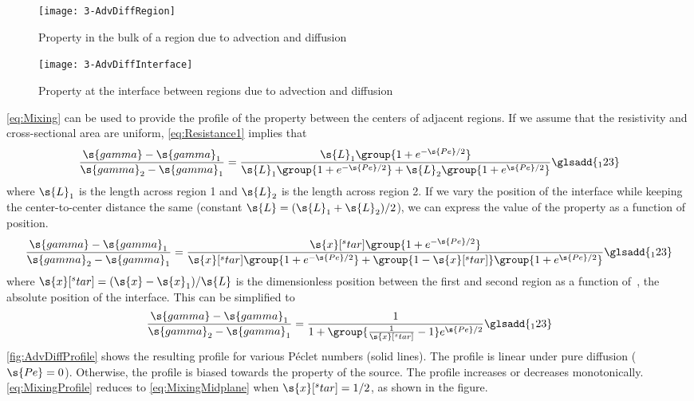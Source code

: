 \begin{figure}[htbp]
  \texttt{[image: 3-AdvDiffRegion]}%
  \caption{Property in the bulk of a region due to advection and diffusion}%
  \label{fig:AdvDiffRegion}
\end{figure}

\begin{figure}[htbp]
  \texttt{[image: 3-AdvDiffInterface]}%
  \caption{Property at the interface between regions due to advection and diffusion}%
  \label{fig:AdvDiffInterface}
\end{figure}

\autoref{eq:Mixing} can be used to provide the profile of the property between the centers of adjacent regions.  If we assume that the resistivity and cross-sectional area are uniform, \autoref{eq:Resistance1} implies that
\begin{equation}
  \frac{\s{gamma} - \s{gamma}_1}{\s{gamma}_2 - \s{gamma}_1} = \frac{\s{L}_1\group{1 + e^{-\s{Pe}/2}}}{\s{L}_1\group{1 + e^{-\s{Pe}/2}} + \s{L}_2\group{1 + e^{\s{Pe}/2}}}%
  \glsadd{_123}
\end{equation}
where $\s{L}_1$ is the length across region 1 and $\s{L}_2$ is the length across region 2.  If we vary the position of the interface while keeping the center-to-center distance the same (constant $\s{L} = (\s{L}_1 + \s{L}_2)/2$), we can express the value of the property as a function of position.
\begin{equation}
  \frac{\s{gamma} - \s{gamma}_1}{\s{gamma}_2 - \s{gamma}_1} = \frac{\s{x}[^star]\group{1 + e^{-\s{Pe}/2}}}{\s{x}[^star]\group{1 + e^{-\s{Pe}/2}} + \group{1 - \s{x}[^star]}\group{1 + e^{\s{Pe}/2}}}%
  \glsadd{_123}
\end{equation}
where $\s{x}[^star] = (\s{x} - \s{x}_1)/\s{L}$ is the dimensionless position between the first and second region as a function of~, the absolute position of the interface.  This can be simplified to
\begin{equation}
  \label{eq:MixingProfile}
  \frac{\s{gamma} - \s{gamma}_1}{\s{gamma}_2 - \s{gamma}_1} = \frac{1}{1 + \group{\frac{1}{\s{x}[^star]} - 1}e^{\s{Pe}/2}}%
  \glsadd{_123}
\end{equation}
\autoref{fig:AdvDiffProfile} shows the resulting profile for various P\'eclet numbers (solid lines).  The profile is linear under pure diffusion ($\s{Pe} = 0$).  Otherwise, the profile is biased towards the property of the source.  The profile increases or decreases monotonically.  \autoref{eq:MixingProfile} reduces to \autoref{eq:MixingMidplane} when $\s{x}[^star] = 1/2$, as shown in the figure.


